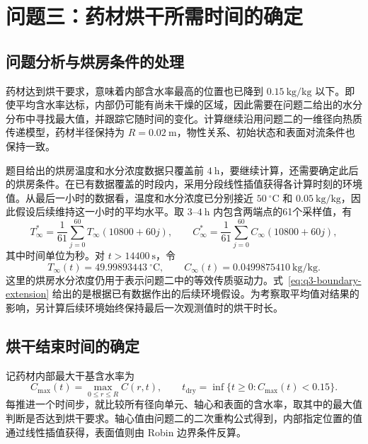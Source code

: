 \section{问题三：药材烘干所需时间的确定}
\label{sec:q3}

\subsection{问题分析与烘房条件的处理}

药材达到烘干要求，意味着内部含水率最高的位置也已降到 $0.15~\mathrm{kg/kg}$ 以下。即使平均含水率达标，内部仍可能有尚未干燥的区域，因此需要在问题二给出的水分分布中寻找最大值，并跟踪它随时间的变化。计算继续沿用问题二的一维径向热质传递模型，药材半径保持为 $R=0.02~\mathrm m$，物性关系、初始状态和表面对流条件也保持一致。

题目给出的烘房温度和水分浓度数据只覆盖前 $4~\mathrm h$，要继续计算，还需要确定此后的烘房条件。在已有数据覆盖的时段内，采用分段线性插值获得各计算时刻的环境值。从最后一小时的数据看，温度和水分浓度已分别接近 $50~^\circ\mathrm C$ 和 $0.05~\mathrm{kg/kg}$，因此假设后续维持这一小时的平均水平。取 $3$--$4~\mathrm h$ 内包含两端点的61个采样值，有
\begin{equation}
 T_\infty^\ast=\frac{1}{61}\sum_{j=0}^{60}T_\infty(10800+60j),
 \qquad
 C_\infty^\ast=\frac{1}{61}\sum_{j=0}^{60}C_\infty(10800+60j),
 \label{eq:q3-boundary-mean}
\end{equation}
其中时间单位为秒。对 $t>14400~\mathrm s$，令
\begin{equation}
 T_\infty(t)=49.99893443~^\circ\mathrm C,\qquad
 C_\infty(t)=0.0499875410~\mathrm{kg/kg}.
 \label{eq:q3-boundary-extension}
\end{equation}
这里的烘房水分浓度仍用于表示问题二中的等效传质驱动力。式~\eqref{eq:q3-boundary-extension} 给出的是根据已有数据作出的后续环境假设。为考察取平均值对结果的影响，另计算后续环境始终保持最后一次观测值时的烘干时长。

\subsection{烘干结束时间的确定}

记药材内部最大干基含水率为
\begin{equation}
 C_{\max}(t)=\max_{0\le r\le R}C(r,t),\qquad
 t_{\mathrm{dry}}=\inf\bigl\{t\ge0:C_{\max}(t)<0.15\bigr\}.
 \label{eq:q3-endpoint}
\end{equation}
每推进一个时间步，就比较所有径向单元、轴心和表面的含水率，取其中的最大值判断是否达到烘干要求。轴心值由问题二的二次重构公式得到，内部指定位置的值通过线性插值获得，表面值则由 Robin 边界条件反算。

